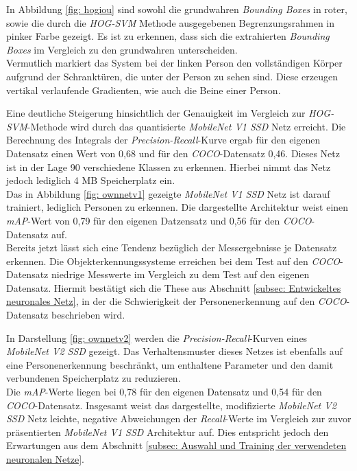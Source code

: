 In Abbildung \ref{fig: hogiou} sind sowohl die grundwahren \textit{Bounding Boxes} in roter, sowie die durch die \textit{HOG-SVM} Methode ausgegebenen Begrenzungsrahmen in pinker Farbe gezeigt. Es ist zu erkennen, dass sich die extrahierten \textit{Bounding Boxes} im Vergleich zu den grundwahren unterscheiden.\\

 Vermutlich markiert das System bei der linken Person den vollständigen Körper aufgrund der Schranktüren, die unter der Person zu sehen sind. Diese erzeugen vertikal verlaufende Gradienten, wie auch die Beine einer Person.


Eine deutliche Steigerung hinsichtlich der Genauigkeit im Vergleich zur \textit{HOG-SVM}-Methode wird durch das quantisierte \textit{MobileNet V1 SSD} Netz erreicht. Die Berechnung des Integrals der \textit{Precision-Recall}-Kurve ergab für den eigenen Datensatz einen Wert von 0,68 und für den \textit{COCO}-Datensatz 0,46. Dieses Netz ist in der Lage 90 verschiedene Klassen zu erkennen. Hierbei nimmt das Netz jedoch lediglich 4 MB Speicherplatz ein.\\



Das in Abbildung \ref{fig: ownnetv1} gezeigte \textit{MobileNet V1 SSD} Netz ist darauf trainiert, lediglich Personen zu erkennen. Die dargestellte Architektur weist einen \textit{mAP}-Wert von 0,79 für den eigenen Datzensatz und 0,56 für den \textit{COCO}-Datensatz auf. \\

Bereits jetzt lässt sich eine Tendenz bezüglich der Messergebnisse je Datensatz erkennen. Die Objekterkennungssysteme erreichen bei dem Test auf den \textit{COCO}-Datensatz niedrige Messwerte im Vergleich zu dem Test auf den eigenen Datensatz. Hiermit bestätigt sich die These aus Abschnitt \ref{subsec: Entwickeltes neuronales Netz}, in der die Schwierigkeit der Personenerkennung auf den \textit{COCO}-Datensatz beschrieben wird.



In Darstellung \ref{fig: ownnetv2} werden die \textit{Precision-Recall}-Kurven eines \textit{MobileNet V2 SSD} gezeigt. Das Verhaltensmuster dieses Netzes ist ebenfalls auf eine Personenerkennung beschränkt, um enthaltene Parameter und den damit verbundenen Speicherplatz zu reduzieren.\\

Die \textit{mAP}-Werte liegen bei 0,78 für den eigenen Datensatz und 0,54 für den \textit{COCO}-Datensatz. Insgesamt weist das dargestellte, modifizierte \textit{MobileNet V2 SSD} Netz leichte, negative Abweichungen der \textit{Recall}-Werte im Vergleich zur zuvor präsentierten \textit{MobileNet V1 SSD} Architektur auf. Dies entspricht jedoch den Erwartungen aus dem Abschnitt \ref{subsec: Auswahl und Training der verwendeten neuronalen Netze}.

